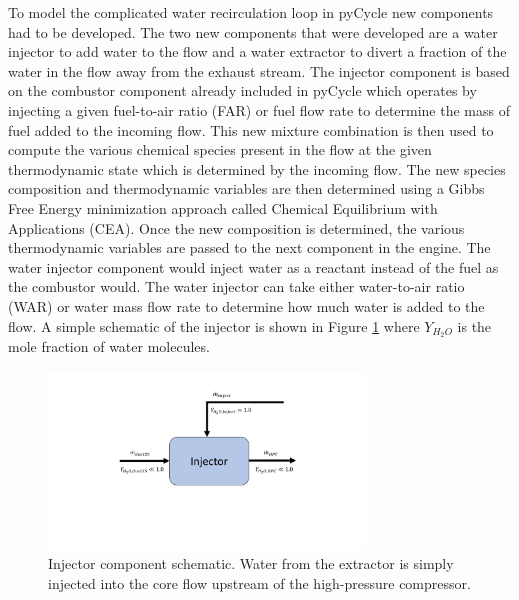 \documentclass[conf]{new-aiaa}
\begin{document}
To model the complicated water recirculation loop in pyCycle new components had to be developed.
The two new components that were developed are a water injector to add water to the flow and a water extractor to divert a fraction of the water in the flow away from the exhaust stream.
The injector component is based on the combustor component already included in pyCycle which operates by injecting a given fuel-to-air ratio (FAR) or fuel flow rate to determine the mass of fuel added to the incoming flow.
This new mixture combination is then used to compute the various chemical species present in the flow at the given thermodynamic state which is determined by the incoming flow.
The new species composition and thermodynamic variables are then determined using a Gibbs Free Energy minimization approach called Chemical Equilibrium with Applications (CEA).
Once the new composition is determined, the various thermodynamic variables are passed to the next component in the engine.
The water injector component would inject water as a reactant instead of the fuel as the combustor would.
The water injector can take either water-to-air ratio (WAR) or water mass flow rate to determine how much water is added to the flow.
A simple schematic of the injector is shown in Figure \ref{fig:injector} where $Y_{H_2O}$ is the mole fraction of water molecules.

\begin{figure}[hbt!]
  \centering
  \includegraphics[width=0.75\textwidth]{injector.pdf}
  \caption{
    Injector component schematic.
    Water from the extractor is simply injected into the core flow upstream of the high-pressure compressor.
  }
  \label{fig:injector}
\end{figure}
\end{document}
